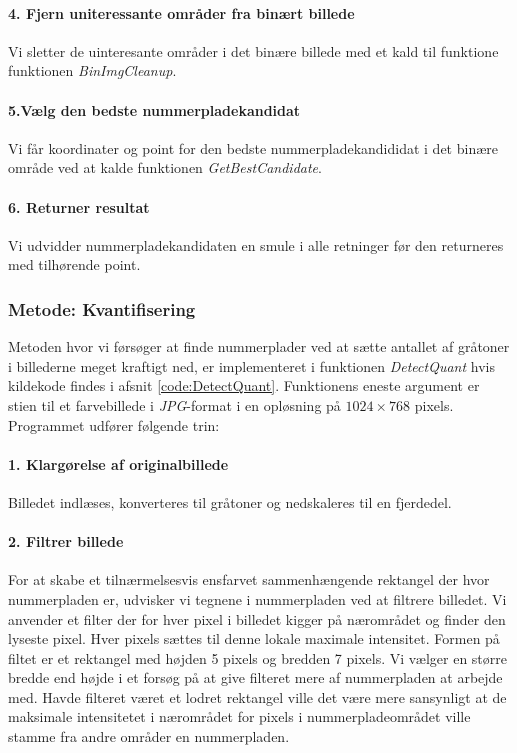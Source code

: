 \paragraph{4. Fjern uniteressante områder fra binært billede}
Vi sletter de uinteresante områder i det binære billede med et kald til funktione funktionen \textit{BinImgCleanup}.

\paragraph{5.Vælg den bedste nummerpladekandidat}
Vi får koordinater og point for den bedste nummerpladekandididat i det binære område ved at kalde funktionen \textit{GetBestCandidate}. 

\paragraph{6. Returner resultat}
Vi udvidder nummerpladekandidaten en smule i alle retninger før den returneres med tilhørende point.

\subsubsection{Metode: Kvantifisering}
Metoden hvor vi førsøger at finde nummerplader ved at sætte antallet af gråtoner i billederne meget kraftigt ned, er implementeret i funktionen \textit{DetectQuant} hvis kildekode findes i afsnit \vref{code:DetectQuant}. Funktionens eneste argument er stien til et farvebillede i \textit{JPG}-format i en opløsning på $1024 \times 768$ pixels. Programmet udfører følgende trin:

\paragraph{1. Klargørelse af originalbillede}
Billedet indlæses, konverteres til gråtoner og nedskaleres til en fjerdedel. 

\paragraph{2. Filtrer billede}
For at skabe et tilnærmelsesvis ensfarvet sammenhængende rektangel der hvor nummerpladen er, udvisker vi tegnene i nummerpladen ved at filtrere billedet. Vi anvender et filter der for hver pixel i billedet kigger på nærområdet og finder den lyseste pixel. Hver pixels sættes til denne lokale maximale intensitet. Formen på filtet er et rektangel med højden 5 pixels og bredden 7 pixels. Vi vælger en større bredde end højde i et forsøg på at give filteret mere af  nummerpladen at arbejde med. Havde filteret været et lodret rektangel ville det være mere sansynligt at de maksimale intensitetet i nærområdet for pixels i nummerpladeområdet ville stamme fra andre områder en nummerpladen.

